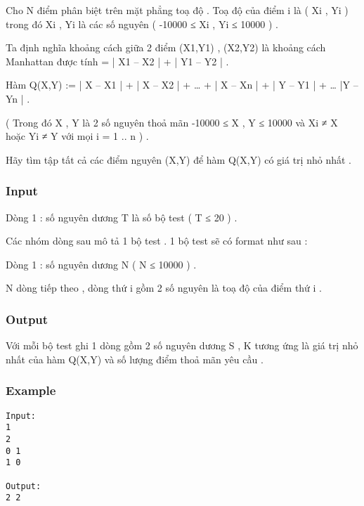 



   Cho N điểm phân biệt trên mặt phẳng toạ độ . Toạ độ của điểm i là ( Xi , Yi ) trong đó Xi , Yi là các số nguyên ( -10000 ≤ Xi , Yi ≤ 10000 ) .   


   Ta định nghĩa khoảng cách giữa 2 điểm (X1,Y1) , (X2,Y2) là khoảng cách Manhattan được tính = | X1 – X2 | + | Y1 – Y2 | .   


   Hàm Q(X,Y) := | X – X1 | + | X – X2 | + … + | X – Xn | + | Y – Y1 | + … |Y – Yn | .   


   ( Trong đó X , Y là 2 số nguyên thoả mãn -10000 ≤ X , Y ≤ 10000 và Xi ≠ X hoặc Yi ≠ Y với mọi i = 1 .. n  ) .   


   Hãy tìm tập tất cả các điểm nguyên (X,Y) để hàm Q(X,Y) có giá trị nhỏ nhất .  

\subsubsection{   Input  }

   Dòng 1 : số nguyên dương T là số bộ test ( T ≤ 20 ) .   


   Các nhóm dòng sau mô tả 1 bộ test . 1 bộ test sẽ có format như sau :   


   Dòng 1 : số nguyên dương N (  N ≤ 10000 ) .   


   N dòng tiếp theo , dòng thứ i gồm 2 số nguyên là toạ độ của điểm thứ i .  

\subsubsection{   Output  }

   Với mỗi bộ test ghi 1 dòng gồm 2 số nguyên dương S , K tương ứng là giá trị nhỏ nhất của hàm Q(X,Y) và số lượng điểm thoả mãn yêu cầu .   




\subsubsection{   Example  }
\begin{verbatim}
Input:
1
2
0 1
1 0

Output:
2 2
\end{verbatim}
